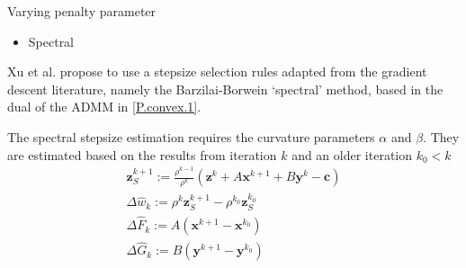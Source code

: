 \documentclass[8pt,red]{beamer}
\theoremstyle{plain}
\theoremstyle{definition}
\theoremstyle{remark}
\newcommand{\bi}[1]{\ensuremath{\boldsymbol{#1}}}
\begin{document}
\begin{frame}{Varying penalty parameter}
\begin{itemize}
\item Spectral
\end{itemize}
Xu et al. \citep{xu2016adaptive} propose to use a stepsize selection rules adapted from the gradient descent literature, namely the Barzilai-Borwein `spectral' method, based in the dual of the ADMM in \eqref{P.convex.1}.

The spectral stepsize estimation requires the curvature parameters $\alpha$ and $\beta$. They are estimated based on the results from iteration $k$ and an older iteration $k_{0} < k$
\begin{align}
  \bi{z}_{S}^{k+1} := \frac{\rho^{k-1}}{\rho^{k}} \left(\bi{z}^{k} + A \bi{x}^{k+1} + B \bi{y}^{k} - \bi{c}\right) \\
  \Delta \hat{w}_{k} := \rho^{k} \bi{z}_{S}^{k+1} - \rho^{k_{0}} \bi{z}_{S}^{k_{0}} \\
  \Delta \hat{F}_{k} := A \left( \bi{x}^{k+1} - \bi{x}^{k_{0}} \right) \\
  \Delta \hat{G}_{k} := B \left( \bi{y}^{k+1} - \bi{y}^{k_{0}} \right)
\end{align}
\end{frame}
\end{document}
